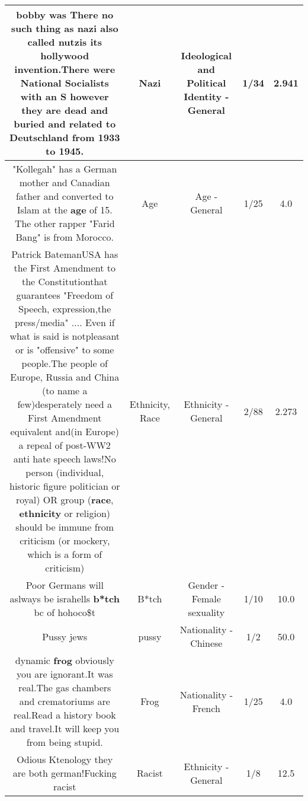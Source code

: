 \documentclass[11pt]{article}
\newlength\mylength
\begin{document}
\begin{center}
\begin{longtable}{|C{.65\mylength}|C{.30\mylength}|C{.12\mylength}|C{.12\mylength}|C{.12\mylength}|}
  \small bobby was There no such thing as \textbf{nazi} also called nutzis its hollywood invention.There were National Socialists with an S however they are dead and buried and related to Deutschland from 1933 to 1945.\normalsize   & Nazi &  Ideological and Political Identity - General & 1/34 & 2.941 \\  \hline
  \small "Kollegah" has a German mother and Canadian father and converted to Islam at the \textbf{age} of 15. The other rapper "Farid Bang" is from Morocco.\normalsize   & Age & Age - General & 1/25 & 4.0 \\  \hline
  \small Patrick BatemanUSA has the First Amendment to the Constitutionthat guarantees "Freedom of Speech, expression,the press/media" .... Even if what is said is notpleasant or is "offensive" to some people.The people of Europe, Russia and China (to name a few)desperately need a First Amendment equivalent and(in Europe) a repeal of post-WW2 anti hate speech laws!No person (individual, historic figure politician or royal) OR group (\textbf{race}, \textbf{ethnicity} or religion) should be immune from criticism (or mockery, which is a form of criticism)\normalsize   & Ethnicity, Race & Ethnicity - General & 2/88 & 2.273 \\  \hline
  \small Poor Germans will aslways be israhells \textbf{b*tch} bc of hohoco\$t\normalsize   & B*tch & Gender - Female sexuality & 1/10 & 10.0 \\  \hline
  \small Pussy jews\normalsize   & pussy & Nationality - Chinese & 1/2 & 50.0 \\  \hline
  \small dynamic \textbf{frog} obviously you are ignorant.It was real.The gas chambers and crematoriums are real.Read a history book and travel.It will keep you from being stupid.\normalsize   & Frog & Nationality - French & 1/25 & 4.0 \\  \hline
  \small Odious Ktenology they are both german!Fucking racist\normalsize   & Racist & Ethnicity - General & 1/8 & 12.5 \\  \hline

\end{longtable}
\end{center}
\end{document}
